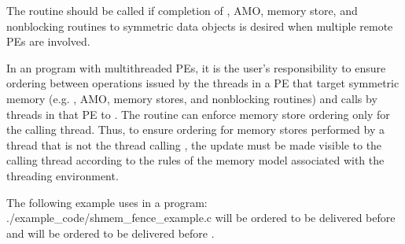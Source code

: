 \begin{apidefinition}
{    The  routine should be called if completion of \PUT{},
    \ac{AMO}, memory store, and nonblocking \PUT{} routines to symmetric data objects is desired
    when multiple remote \acp{PE} are involved.

    In an \openshmem program with multithreaded \acp{PE}, it is the
    user's responsibility to ensure ordering between operations issued by the threads
    in a \ac{PE} that target symmetric memory (e.g. \PUT{}, \ac{AMO}, memory stores,
    and nonblocking routines) and calls by threads in that \ac{PE} to
    . The  routine can enforce memory store ordering only for the
    calling thread. Thus, to ensure ordering for memory stores performed by a thread that is
    not the thread calling , the update must be made visible to the
    calling thread according to the rules of the memory model associated with
    the threading environment.
}

\begin{apiexamples}

\apicexample
    {The following example uses  in a \Cstd[11] program: }
    {./example_code/shmem_fence_example.c}
    { will be ordered to be delivered before  and 
    will be ordered to be delivered before .}

\end{apiexamples}

\end{apidefinition}
